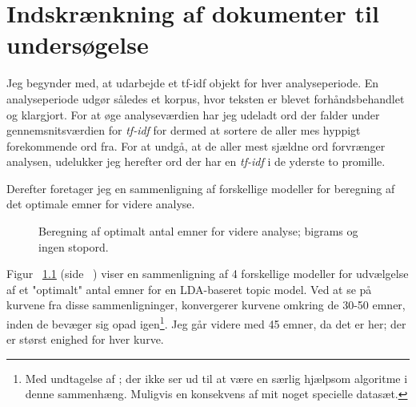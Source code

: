 \chapter{Indskrænkning af dokumenter til undersøgelse}

Jeg begynder med, at udarbejde et tf-idf objekt for hver analyseperiode.
En analyseperiode udgør således et korpus, hvor teksten er blevet forhåndsbehandlet og klargjort.
For at øge analyseværdien har jeg udeladt ord der falder under gennemsnitsværdien for \textit{tf-idf} for dermed at sortere de aller mes hyppigt forekommende ord fra.
For at undgå, at de aller mest sjældne ord forvrænger analysen, udelukker jeg herefter ord der har en \textit{tf-idf} i de yderste to promille.

Derefter foretager jeg en sammenligning af forskellige modeller for beregning af det optimale emner for videre analyse.

\begin{figure}

\caption{Beregning af optimalt antal emner for videre analyse; bigrams og ingen stopord.}
\label{fig:modelsFull}
\end{figure}

Figur ~\ref{fig:modelsFull} (side ~\pageref{fig:modelsFull}) viser en sammenligning af 4 forskellige modeller for udvælgelse af et "optimalt" antal emner for en LDA-baseret topic model.
Ved at se på kurvene fra disse sammenligninger, konvergerer kurvene omkring de 30-50 emner, inden de bevæger sig opad igen\footnote{Med undtagelse af \autocite{deveaudAccurateEffectiveLatent2014}; der ikke ser ud til at være en særlig hjælpsom algoritme i denne sammenhæng. Muligvis en konsekvens af mit noget specielle datasæt.}.
Jeg går videre med 45 emner, da det er her; der er størst enighed for hver kurve.

